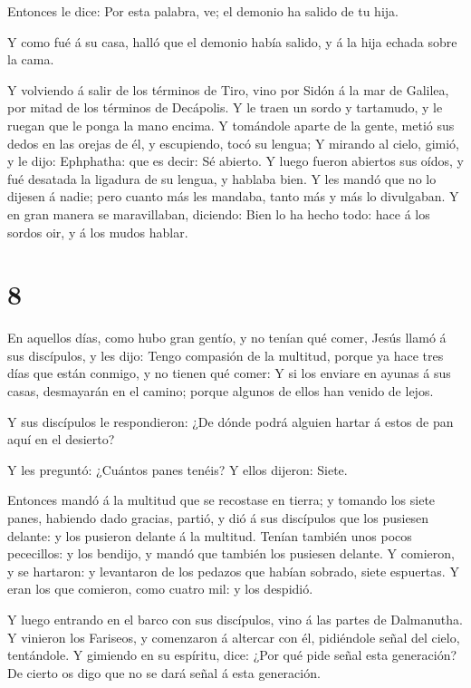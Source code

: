  Entonces le dice: Por esta palabra, ve; el demonio ha
salido de tu hija.

 Y como fué á su casa, halló que el demonio había salido, y
á la hija echada sobre la cama.

 Y volviendo á salir de los términos de Tiro, vino por
Sidón á la mar de Galilea, por mitad de los términos de Decápolis.
 Y le traen un sordo y tartamudo, y le ruegan que le ponga
la mano encima.  Y tomándole aparte de la gente, metió sus
dedos en las orejas de él, y escupiendo, tocó su lengua;  Y
mirando al cielo, gimió, y le dijo: Ephphatha: que es decir: Sé abierto.
 Y luego fueron abiertos sus oídos, y fué desatada la
ligadura de su lengua, y hablaba bien.  Y les mandó que no
lo dijesen á nadie; pero cuanto más les mandaba, tanto más y más lo
divulgaban.  Y en gran manera se maravillaban, diciendo:
Bien lo ha hecho todo: hace á los sordos oir, y á los mudos hablar.

\hypertarget{section-7}{%
\section{8}\label{section-7}}

 En aquellos días, como hubo gran gentío, y no tenían qué
comer, Jesús llamó á sus discípulos, y les dijo:  Tengo
compasión de la multitud, porque ya hace tres días que están conmigo, y
no tienen qué comer:  Y si los enviare en ayunas á sus
casas, desmayarán en el camino; porque algunos de ellos han venido de
lejos.

 Y sus discípulos le respondieron: ¿De dónde podrá alguien
hartar á estos de pan aquí en el desierto?

 Y les preguntó: ¿Cuántos panes tenéis? Y ellos dijeron:
Siete.

 Entonces mandó á la multitud que se recostase en tierra; y
tomando los siete panes, habiendo dado gracias, partió, y dió á sus
discípulos que los pusiesen delante: y los pusieron delante á la
multitud.  Tenían también unos pocos pececillos: y los
bendijo, y mandó que también los pusiesen delante.  Y
comieron, y se hartaron: y levantaron de los pedazos que habían sobrado,
siete espuertas.  Y eran los que comieron, como cuatro mil:
y los despidió.

 Y luego entrando en el barco con sus discípulos, vino á
las partes de Dalmanutha.  Y vinieron los Fariseos, y
comenzaron á altercar con él, pidiéndole señal del cielo, tentándole.
 Y gimiendo en su espíritu, dice: ¿Por qué pide señal esta
generación? De cierto os digo que no se dará señal á esta generación.

